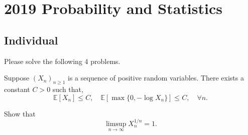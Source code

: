 \section{2019 Probability and Statistics}

\subsection{Individual}
Please solve the following 4 problems.

\begin{exercise}\label{probability:2019:1}
Suppose $(X_n)_{n \geq 1}$ is a sequence of positive random variables. There exists a constant $C > 0$ such that,
\[
\mathbb{E}[X_n] \leq C, \quad \mathbb{E}[\max\{0, -\log X_n\}] \leq C, \quad \forall n.
\]

Show that
\[
\limsup_{n \to \infty} X_n^{1/n} = 1.
\]
\end{exercise}

